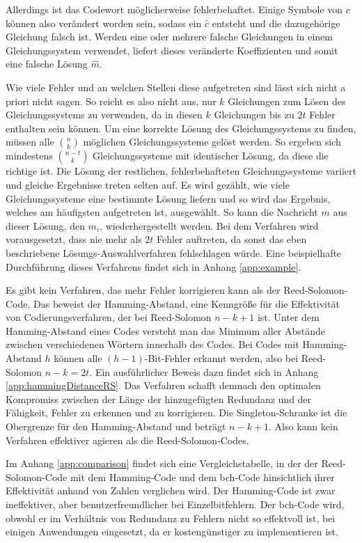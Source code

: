 Allerdings ist das Codewort möglicherweise fehlerbehaftet. 
Einige Symbole von $c$ können also verändert worden sein, sodass ein $\hat{c}$ entsteht und die dazugehörige Gleichung falsch ist.
Werden eine oder mehrere falsche Gleichungen in einem Gleichungssystem verwendet, liefert dieses veränderte Koeffizienten und somit eine falsche Lösung $\hat{m}$.

Wie viele Fehler und an welchen Stellen diese aufgetreten sind lässt sich nicht a priori nicht sagen. 
So reicht es also nicht aus, nur $k$ Gleichungen zum Lösen des Gleichungssystems zu verwenden, da in diesen $k$ Gleichungen bis zu $2t$ Fehler enthalten sein können.
Um eine korrekte Lösung des Gleichungssystems zu finden, müssen alle $\binom{n}{k}$ möglichen Gleichungssysteme gelöst werden.
So ergeben sich mindestens $\binom{n-t}{k}$ Gleichungssysteme mit identischer Lösung, da diese die richtige ist.
Die Lösung der restlichen, fehlerbehafteten Gleichungssysteme variiert und gleiche Ergebnisse treten selten auf.
Es wird gezählt, wie viele Gleichungssysteme eine bestimmte Lösung liefern und so wird das Ergebnis, welches am häufigsten aufgetreten ist, ausgewählt. 
So kann die Nachricht $m$ aus dieser Lösung, den $m_i$, wiederhergestellt werden.
Bei dem Verfahren wird vorausgesetzt, dass nie mehr als $2t$ Fehler auftreten, da sonst das eben beschriebene Lösungs-Auswahlverfahren fehlschlagen würde.
Eine beispielhafte Durchführung dieses Verfahrens findet sich in Anhang \ref{app:example}.

Es gibt kein Verfahren, das mehr Fehler korrigieren kann als der Reed-Solomon-Code.
Das beweist der Hamming-Abstand, eine Kenngröße für die Effektivität von Codierungsverfahren, der bei Reed-Solomon $n-k+1$ ist.
Unter dem Hamming-Abstand eines Codes versteht man das Minimum aller Abstände zwischen verschiedenen Wörtern innerhalb des Codes.
Bei Codes mit Hamming-Abstand $h$ können alle $(h-1)$-Bit-Fehler erkannt werden, also bei Reed-Solomon $n-k=2t$.
Ein ausführlicher Beweis dazu findet sich in Anhang \ref{app:hammingDistanceRS}.
Das Verfahren schafft demnach den optimalen Kompromiss zwischen der Länge der hinzugefügten Redundanz und der Fähigkeit, Fehler zu erkennen und zu korrigieren.
Die Singleton-Schranke ist die Obergrenze für den Hamming-Abstand und beträgt $n-k+1$.
Also kann kein Verfahren effektiver agieren als die Reed-Solomon-Codes.

Im Anhang \ref{app:comparison} findet sich eine Vergleichstabelle, in der der Reed-Solomon-Code mit dem Hamming-Code und dem \acrshort{bch}-Code hinsichtlich ihrer Effektivität anhand von Zahlen verglichen wird.
Der Hamming-Code ist zwar ineffektiver, aber benutzerfreundlicher bei Einzelbitfehlern.
Der \acrshort{bch}-Code wird, obwohl er im Verhältnis von Redundanz zu Fehlern nicht so effektvoll ist, bei einigen Anwendungen eingesetzt, da er kostengünstiger zu implementieren ist. 

